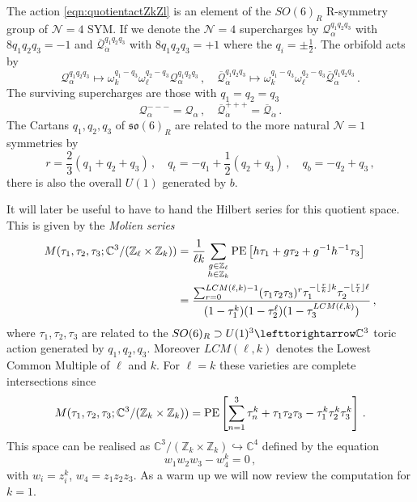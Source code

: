 \documentclass[main.tex]{subfiles}
\begin{document}
The action \eqref{eqn:quotientactZkZl} is an element of the $SO(6)_R$ R-symmetry group of $\mathcal{N}=4$ SYM. If we denote the $\mathcal{N}=4$ supercharges by $\mathcal{Q}_{\alpha}^{q_1q_2q_3}$ with $8q_1q_2q_3=-1$ and $\overline{\mathcal{Q}}_{\dot\alpha}^{q_1q_2q_3}$ with $8q_1q_2q_3=+1$ where the $q_i=\pm\frac{1}{2}$. The orbifold acts by
\begin{equation}
\mathcal{Q}_{\alpha}^{q_1q_2q_3}\mapsto \omega_k^{q_1-q_3}\omega_{\ell}^{q_2-q_3}\mathcal{Q}_{\alpha}^{q_1q_2q_3}\,,\quad
\overline{\mathcal{Q}}_{\dot\alpha}^{q_1q_2q_3}\mapsto \omega_k^{q_1-q_3}\omega_{\ell}^{q_2-q_3}\overline{\mathcal{Q}}_{\dot\alpha}^{q_1q_2q_3}\,.
\end{equation}
The surviving supercharges are those with $q_1=q_2=q_3$
\begin{equation}
\mathcal{Q}_{\alpha}^{---}=\mathcal{Q}_{\alpha}\,,\quad\overline{\mathcal{Q}}^{+++}_{\dot\alpha}=\overline{\mathcal{Q}}_{\dot\alpha}\,.
\end{equation}
The Cartans $q_1,q_2,q_3$ of $\mathfrak{so}(6)_R$ are related to the more natural $\mathcal{N}=1$ symmetries by
\begin{equation}\label{eqn:N4N1ides}
r=\frac{2}{3}(q_1+q_2+q_3)\,,\quad q_t=-q_1+\frac{1}{2}(q_2+q_3)\,,\quad q_b=-q_2+q_3\,,
\end{equation} 
there is also the overall $U(1)$ generated by $b$.

It will later be useful to have to hand the Hilbert series for this quotient space. This is given by the \textit{Molien series}
\begin{equation}
\begin{aligned}\label{eqn:moilen}
M(\tau_1,\tau_2,\tau_3;\mathbb{C}^3/(\mathbb{Z}_{\ell}\times\mathbb{Z}_k))&=\frac{1}{\ell k}\sum_{\substack{g\in\mathbb{Z}_{\ell}\\h\in\mathbb{Z}_k}}\operatorname{\mathrm{PE}}\left[h\tau_1+g\tau_2+g^{-1}h^{-1}\tau_3\right]\\
&=\frac{\sum_{r=0}^{LCM(\ell,k)-1}(\tau_1\tau_2\tau_3)^r\tau_1^{-\lfloor\frac{r}{k}\rfloor k}\tau_2^{-\lfloor\frac{r}{\ell}\rfloor\ell}}{(1-\tau_1^k)(1-\tau_2^{\ell})(1-\tau_3^{LCM(\ell,k)})}
\,,\end{aligned}
\end{equation}
where $\tau_1,\tau_2,\tau_3$ are related to the $SO(6)_R\supset U(1)^{3}\lefttorightarrow\mathbb{C}^3$ toric action generated by $q_1,q_2,q_3$. Moreover $LCM(\ell,k)$ denotes the Lowest Common Multiple of $\ell$ and $k$. For $\ell=k$ these varieties are complete intersections since 
\begin{equation}
M(\tau_1,\tau_2,\tau_3;\mathbb{C}^3/(\mathbb{Z}_{k}\times\mathbb{Z}_k))=\operatorname{\mathrm{PE}}\left[\sum_{n=1}^3\tau_n^k+\tau_1\tau_2\tau_3-\tau_1^k\tau_2^k\tau_3^k\right]\,.
\end{equation}
This space can be realised as $\mathbb{C}^3/(\mathbb{Z}_{k}\times\mathbb{Z}_k)\hookrightarrow\mathbb{C}^4$ defined by the equation
\begin{equation}
w_1w_2w_3-w_4^k=0\,,
\end{equation}
with $w_i=z_i^k$, $w_4=z_1z_2z_3$.
As a warm up we will now review the computation for $k=1$.
\end{document}
